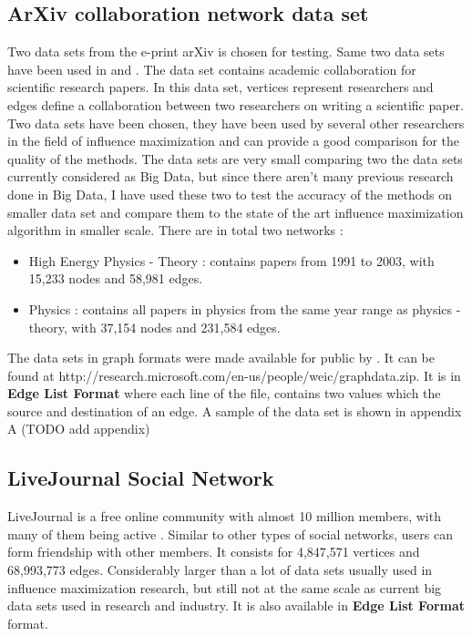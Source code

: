 \documentclass[english]{tktltiki}
\begin{document}
\subsection{ArXiv collaboration network data set}
Two data sets from the e-print arXiv is chosen for testing. Same two data sets have been used in \cite{kempe03} and \cite{chen09}. The data set contains academic collaboration for scientific research papers. In this data set, vertices represent researchers and edges define a collaboration between two researchers on writing a scientific paper. Two data sets have been chosen, they have been used by several other researchers in the field of influence maximization and can provide a good comparison for the quality of the methods. The data sets are very small comparing two the data sets currently considered as Big Data, but since there aren't many previous research done in Big Data, I have used these two to test the accuracy of the methods on smaller data set and compare them to the state of the art influence maximization algorithm in smaller scale. There are in total two networks : 
\begin{itemize}
\item High Energy Physics - Theory : contains papers from 1991 to 2003, with 15,233 nodes and 58,981 edges.
\item Physics : contains all papers in  physics from the same year range as physics - theory, with 37,154 nodes and 231,584 edges.
\end{itemize}
The data sets in graph formats were made available for public by \cite{chen09}. It can be found at http://research.microsoft.com/en-us/people/weic/graphdata.zip. It is in \textbf{Edge List Format} where each line of the file, contains two values which the source and destination of an edge. A sample of the data set is shown in appendix A (TODO add appendix)

\subsection{LiveJournal Social Network}
LiveJournal is a free online community with almost 10 million members, with many of them being active . Similar to other types of social networks, users can form friendship with other members. It consists for 4,847,571 vertices and 68,993,773 edges. Considerably larger than a lot of data sets usually used in influence maximization research, but still not at the same scale as current big data sets used in research and industry.  It is also available in \textbf{Edge List Format} format.
\end{document}
